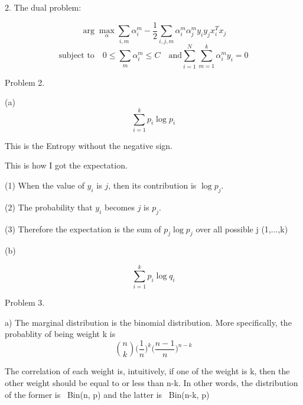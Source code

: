\documentclass[11pt]{article}
\theoremstyle{definition}
\begin{document}
\bigskip


2. The dual problem:

\begin{equation*}
\arg \max_\alpha \sum_{i,m} \alpha_{i}^{m} - \frac{1}{2} \sum_{i,j,m} \alpha_{i}^{m} \alpha_{j}^{m} y_i y_j x_i^T x_j
\end{equation*}
\begin{equation*}
\text{subject to} \quad 0 \le \sum_{m}\alpha_{i}^{m} \le C \quad \text{and} \sum_{i=1}^{N}\sum_{m=1}^{k} \alpha_{i}^{m} y_i =0 
\end{equation*}

\pagebreak

Problem 2.

\bigskip

(a)
\begin{equation*}
\sum_{i=1}^{k}p_i \log p_i
\end{equation*}


This is the Entropy without the negative sign.

This is how I got the expectation.

(1) When the value of $y_i$ is $j$, then its contribution is $\log p_j$.

(2) The probability that $y_i$ becomes $j$ is $p_j$.

(3) Therefore the expectation is the sum of $p_j \log p_j$ over all possible j (1,...,k)

\bigskip
(b)

\begin{equation*}
\sum_{i=1}^{k}p_i \log q_i
\end{equation*}

\bigskip

\pagebreak

Problem 3.

\bigskip
a) The marginal distribution is the binomial distribution. More specifically, the probablity of being weight k is
\begin{equation*}
\binom{n}{k}  \Big(\frac{1}{n}\Big)^k \Big({\frac {n-1}{n}}\Big)^{n-k}
\end{equation*}

The correlation of each weight is, intuitively, if one of the weight is k, then the other weight should be equal to or less than n-k. In other words, the distribution of the former is ~Bin(n, p) and the latter is ~Bin(n-k, p)
\end{document}
